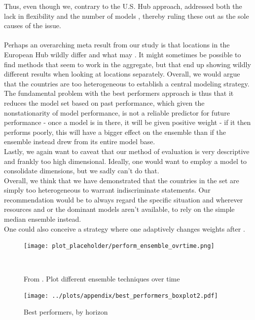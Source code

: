 Thus, even though we, contrary to the U.S. Hub approach, addressed both the lack in flexibility and the number of models , thereby ruling these out as the sole causes of the issue.\\\\
Perhaps an overarching meta result from our study is that locations in the European Hub wildly differ and what may . It might sometimes be possible to find methods that seem to work in the aggregate, but that end up showing wildly different results when looking at locations separately. Overall, we would argue that the countries are too heterogeneous to establish a central modeling strategy.\\
The fundamental problem with the best performers approach is thus that it reduces the model set based on past performance, which given the nonstationarity of model performance, is not a reliable predictor for future performance - once a model is in there, it will be given positive weight - if it then performs poorly, this will have a bigger effect on the ensemble than if the ensemble instead drew from its entire model base.\\
Lastly, we again want to caveat that our method of evaluation is very descriptive and frankly too high dimensional. Ideally, one would want to employ a model to consolidate dimensions, but we sadly can't do that. \\
Overall, we think that we have demonstrated that the countries in the set are simply too heterogeneous to warrant indiscriminate statements. Our recommendation would be to always regard the specific situation and wherever resources and or the dominant models aren't available, to rely on the simple median ensemble instead.\\
One could also conceive a strategy where one adaptively changes weights after .\\
\begin{figure}
\centering
\texttt{[image: plot\_placeholder/perform\_ensemble\_ovrtime.png]}
\caption{From \cite{ray_ensemble_2020}. Plot different ensemble techniques over time}
\
\end{figure}



\appendix
\begin{figure}
\centering
\texttt{[image: ../plots/appendix/best\_performers\_boxplot2.pdf]}
\caption{Best performers, by horizon}
\label{fig:best_performers_by_horizon}
\end{figure}



